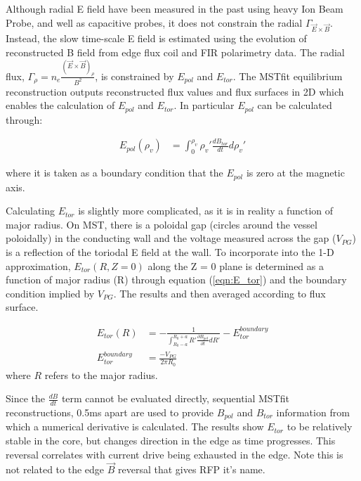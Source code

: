 \documentclass[aip, pop, preprint]{revtex4-1}
\begin{document}
Although radial E field have been measured in the past using heavy Ion Beam Probe, and well as capacitive probes, it does not constrain the
radial $\Gamma_{\vec{E} \times \vec{B}}$. Instead, the slow time-scale E field
is estimated using the evolution of reconstructed B field from edge flux coil
and FIR polarimetry data. The radial flux, $\Gamma_{\rho} = n_e\frac{(\Vec{E}\times\Vec{B})_{\rho}}{B^2}$, is constrained by $E_{pol}$ and $E_{tor}$. The MSTfit equilibrium reconstruction outputs
reconstructed flux values and flux surfaces in 2D which enables the calculation of $E_{pol}$ and $E_{tor}$. In particular $E_{pol}$ can be calculated through:

\begin{align}
E_{pol}(\rho_v) & = \int_{0}^{\rho_v}\rho_v' \frac{dB_{tor}}{dt} d\rho_v'
\end{align}

where it is taken as a boundary condition that the $E_{pol}$ is zero at
the magnetic axis.


Calculating $E_{tor}$ is slightly more complicated, as it is in reality a function of major
radius. On MST, there is a poloidal gap (circles around the vessel poloidally) in the conducting wall and the voltage measured across the gap ($V_{PG}$) is a reflection of the toriodal E field at the wall. To incorporate into the 1-D approximation, $E_{tor}(R, Z=0)$ along the
Z = 0 plane is determined as a function of major radius (R) through equation
(\ref{eqn:E_tor}) and the boundary condition implied by $V_{PG}$. The results and
then averaged according to flux surface. 

\begin{align}
E_{tor}(R) & = -\frac{1}{\int_{R_0 - a}^{R_0 + a} R' \frac{\partial B_{pol}}{\partial t} dR'} - E_{tor}^{boundary} \label{eqn:E_tor}\\
E_{tor}^{boundary} & = \frac{- V_{PG} }{2 \pi R_0}\label{eqn:E_tor_bc}
\end{align}
where $R$ refers to the major radius.

Since the $ \frac{dB}{dt} $ term cannot be evaluated directly, sequential
MSTfit reconstructions, 0.5ms apart are used to provide $ B_{pol} $ and $
B_{tor} $ information from which a numerical derivative is calculated. The results show $E_{tor}$ to
be relatively stable in the core, but changes direction in the edge as time
progresses. This reversal correlates with current drive being exhausted in the
edge. Note this is not related to the edge $\vec{B}$ reversal that gives RFP it's name.
\end{document}
